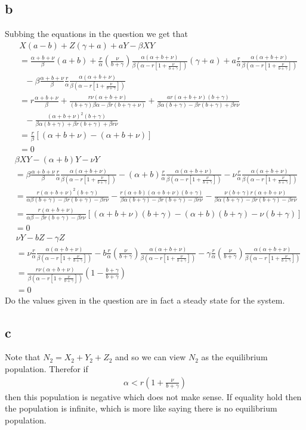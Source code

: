 \documentclass{unswmaths}
\newcommand{\N}{\frac{\alpha(\alpha + b + \nu)}{\beta \left(\alpha - r\left[ 1 + \frac{\nu}{b + \gamma}\right] \right)}}
\newcommand{\X}{\frac{\alpha + b + \nu}{\beta}}
\newcommand{\Y}{\frac{r}{\alpha}\N}
\newcommand{\Z}{\frac{r}{\alpha}\left( \frac{\nu}{b + \gamma} \right)\N}
\begin{document}
\subsection*{b}
    Subbing the equations in the question we get that
    \begin{align*}
        & X(a-b) + Z(\gamma + a) + aY - \beta XY\\ 
&= \X(a+b) + \Z(\gamma + a) + a\Y \\
& \ \ \ - \beta\X\Y \\
&= r\X + \frac{r\nu(\alpha + b + \nu)}{(b+\gamma)\beta\alpha - \beta r(b +\gamma + \nu)} +
\frac{ar(\alpha + b + \nu)(b + \gamma)}{\beta\alpha (b + \gamma) - \beta r ( b + \gamma) + \beta r \nu} \\
& \ \ \ - \frac{(\alpha + b + \nu)^2(b+\gamma)}{\beta\alpha(b + \gamma) + \beta r(b + \gamma) + \beta r \nu} \\
&= \frac{r}{\beta}\left[(\alpha + b + \nu)- (\alpha + b + \nu)\right] \\
&= 0
\end{align*}
\begin{align*}
    &\beta X Y - (\alpha + b) Y - \nu Y \\
    &= \beta \X\Y - (\alpha + b)\Y - \nu \Y \\
    &= \frac{r(\alpha + b + \nu)^2(b + \gamma)}{\alpha\beta(b + \gamma) - \beta r (b + \gamma) - \beta r \nu} 
- \frac{r(\alpha + b)(\alpha + b + \nu)(b + \gamma)}{\beta \alpha(b + \gamma)- \beta r (b + \gamma) - \beta r \nu } 
- \frac{\nu(b + \gamma) r(\alpha + b + \nu)}{\beta \alpha(b + \gamma) -  \beta r (b + \gamma) - \beta r \nu } \\
    &= \frac{r(\alpha+b + \nu)}{\alpha \beta - \beta r (b + \gamma) - \beta r \nu} \left[ (\alpha + b + \nu)(b + \gamma) - (\alpha + b)(b+\gamma) - \nu(b + \gamma)\right] \\
    &= 0
\end{align*}
\begin{align*}
    & \nu Y - b Z - \gamma Z \\
    &= \nu \Y - b \Z - \gamma \Z \\
    &= \frac{r\nu(\alpha + b + \nu)}{\beta\left(\alpha - r\left[ 1 + \frac{\nu}{b + \gamma} \right] \right)} \left( 1 - \frac{b + \gamma}{b + \gamma}\right) \\
    &= 0
\end{align*}
Do the values given in the question are in fact a steady state for the system.
\subsection*{c}
Note that $ N_2 = X_2 + Y_2 + Z_2 $ and so we can view $ N_2 $ as the equilibrium population. Therefor if
\begin{align*}
    \alpha < r\left( 1 + \frac{\nu}{b + \gamma}\right)
\end{align*}
then this population is negative which does not make sense. If equality hold then the population is infinite, which is more like saying there is no equilibrium population.
\end{document}
